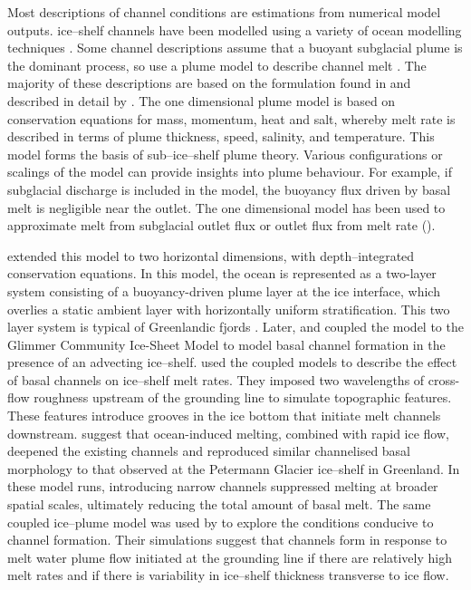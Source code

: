 Most descriptions of channel conditions are estimations from numerical model outputs.
ice--shelf channels have been modelled using a variety of ocean modelling techniques  \citep[e.g.][]{millgate2013effect,gladish2012ice,sergienko2013basal,payne2007numerical}. 
Some channel descriptions assume that a buoyant subglacial plume is the dominant process, so use a plume model to describe channel melt \citep[e.g.][]{gladish2012ice, sergienko2013basal}.
The majority of these descriptions are based on the formulation found in \cite{jenkins2011convection} and described in detail by \cite{hewitt2020subglacial}.
The \cite{jenkins2011convection} one dimensional plume model is based on conservation equations for mass, momentum, heat and salt, whereby melt rate is described in terms of plume thickness, speed, salinity, and temperature. This model forms the basis of sub--ice--shelf plume theory. Various configurations or scalings of the model can provide insights into plume behaviour. For example, if subglacial discharge is included in the model, the buoyancy flux driven by basal melt is negligible near the outlet. The one dimensional model has been used to approximate melt from subglacial outlet flux \cite[e.g.][]{gourmelen2017channelized} or outlet flux from melt rate (\cite[e.g.][]{marsh2016high}).

\cite{holland2006effects} extended this model to two horizontal dimensions, with depth--integrated conservation equations. In this model, the ocean is represented as a two-layer system consisting of a buoyancy-driven plume layer at the ice interface, which overlies a static  ambient layer with horizontally uniform stratification. This two layer system is typical of Greenlandic fjords \citep{hewitt2020subglacial}.
Later, \cite{gladish2012ice,dallaston2015channelization} and \cite{sergienko2013regular} coupled the model to the Glimmer Community Ice-Sheet Model \citep{rutt2009glimmer} to model basal channel formation in the presence of an advecting ice--shelf.
\cite{gladish2012ice} used the coupled models to describe the effect of basal channels on ice--shelf melt rates. They imposed two wavelengths of cross-flow  roughness upstream of the grounding line to simulate topographic features. These features introduce grooves in the ice bottom that initiate melt channels downstream. \cite{gladish2012ice} suggest that ocean-induced melting, combined with rapid ice flow, deepened the existing channels and reproduced similar channelised basal morphology to that observed at the Petermann Glacier ice--shelf in Greenland. In these model runs, introducing narrow channels suppressed melting at broader spatial scales, ultimately reducing the total amount of basal melt.
The same coupled ice--plume model was used by \cite{sergienko2013basal} to explore the conditions conducive to channel formation.  Their simulations suggest that channels form in response to melt water plume flow initiated at the grounding line if there are relatively high melt rates and if there is variability in ice--shelf thickness transverse to ice flow.

